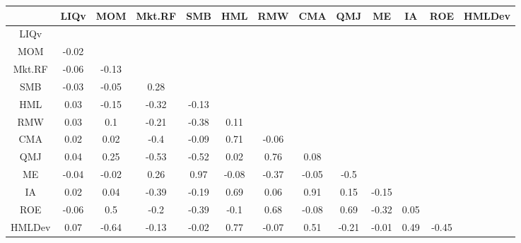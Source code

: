 \begin{tabular}{ccccccccccccc}
  \hline
 & LIQv & MOM & Mkt.RF & SMB & HML & RMW & CMA & QMJ & ME & IA & ROE & HMLDev \\ 
  \hline
LIQv &  &  &  &  &  &  &  &  &  &  &  &  \\ 
  MOM & -0.02 &  &  &  &  &  &  &  &  &  &  &  \\ 
  Mkt.RF & -0.06 & -0.13 &  &  &  &  &  &  &  &  &  &  \\ 
  SMB & -0.03 & -0.05 & 0.28 &  &  &  &  &  &  &  &  &  \\ 
  HML & 0.03 & -0.15 & -0.32 & -0.13 &  &  &  &  &  &  &  &  \\ 
  RMW & 0.03 & 0.1 & -0.21 & -0.38 & 0.11 &  &  &  &  &  &  &  \\ 
  CMA & 0.02 & 0.02 & -0.4 & -0.09 & 0.71 & -0.06 &  &  &  &  &  &  \\ 
  QMJ & 0.04 & 0.25 & -0.53 & -0.52 & 0.02 & 0.76 & 0.08 &  &  &  &  &  \\ 
  ME & -0.04 & -0.02 & 0.26 & 0.97 & -0.08 & -0.37 & -0.05 & -0.5 &  &  &  &  \\ 
  IA & 0.02 & 0.04 & -0.39 & -0.19 & 0.69 & 0.06 & 0.91 & 0.15 & -0.15 &  &  &  \\ 
  ROE & -0.06 & 0.5 & -0.2 & -0.39 & -0.1 & 0.68 & -0.08 & 0.69 & -0.32 & 0.05 &  &  \\ 
  HMLDev & 0.07 & -0.64 & -0.13 & -0.02 & 0.77 & -0.07 & 0.51 & -0.21 & -0.01 & 0.49 & -0.45 &  \\ 
   \hline
\end{tabular}
